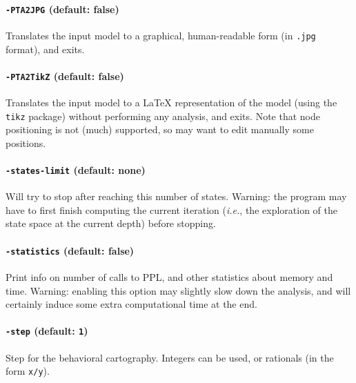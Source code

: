 \documentclass[a4paper,11pt]{report}
\makeatletter
\newcommand{\styleOption}[1]{\textcolor{optioncolor}{\texttt{#1}}}
\newcommand{\ie}{\textcolor{colorok}{\textit{i.e.},\@}}
\makeatother
\begin{document}
\paragraph{\styleOption{-PTA2JPG} (default: false)}
Translates the input model to a graphical, human-readable form (in \texttt{.jpg} format), and exits.

\paragraph{\styleOption{-PTA2TikZ} (default: false)}
Translates the input model to a \LaTeX{} representation of the model (using the \texttt{tikz} package) without performing any analysis, and exits.
Note that node positioning is not (much) supported, so may want to edit manually some positions.

\paragraph{\styleOption{-states-limit} (default: none)}
Will try to stop after reaching this number of states.
Warning: the program may have to first finish computing the current iteration (\ie{} the exploration of the state space at the current depth) before stopping.


\paragraph{\styleOption{-statistics} (default: false)}
Print info on number of calls to PPL, and other statistics about memory and time.
Warning: enabling this option may slightly slow down the analysis, and will certainly induce some extra computational time at the end.



\paragraph{\styleOption{-step} (default: \styleOption{1})}
Step for the behavioral cartography.
Integers can be used, or rationals (in the form \styleOption{x/y}).
\end{document}
